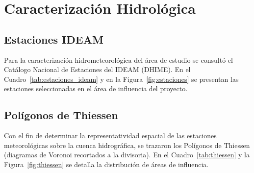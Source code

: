 \documentclass[11pt,a4paper]{article}
\begin{document}
\section{Caracterización Hidrológica}

\subsection{Estaciones IDEAM}
Para la caracterización hidrometeorológica del área de estudio se consultó el Catálogo Nacional de Estaciones del IDEAM (DHIME). En el Cuadro~\ref{tab:estaciones_ideam} y en la Figura~\ref{fig:estaciones} se presentan las estaciones seleccionadas en el área de influencia del proyecto.

\begin{table}[H]
\centering
\caption{Estaciones meteorológicas oficiales del IDEAM identificadas en el área de influencia.}
\label{tab:estaciones_ideam}
\end{table}



\subsection{Polígonos de Thiessen}
Con el fin de determinar la representatividad espacial de las estaciones meteorológicas sobre la cuenca hidrográfica, se trazaron los Polígonos de Thiessen (diagramas de Voronoi recortados a la divisoria). En el Cuadro~\ref{tab:thiessen} y la Figura~\ref{fig:thiessen} se detalla la distribución de áreas de influencia.
\end{document}
